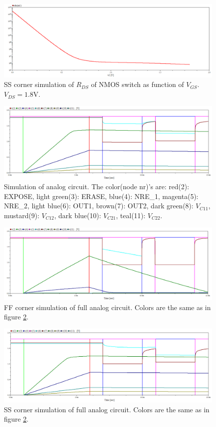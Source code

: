 \begin{figure}[H]
    \centering
    \includegraphics[width=\textwidth]{graphs/corner_ss_simulation.png}
    \caption{SS corner simulation of $R_{DS}$ of NMOS switch as function of $V_{GS}$. $V_{DS} = 1.8\mathrm{V}$.}
    \label{fig:ss}
\end{figure}

\begin{figure}[H]
    \centering
    \includegraphics[width=\textwidth]{graphs/analogWaveform.png}
    \caption{Simulation of analog circuit. The color(node nr)'s are: red(2): EXPOSE, light green(3): ERASE, blue(4): NRE\_1, magenta(5): NRE\_2, light blue(6): OUT1, brown(7): OUT2, dark green(8): $V_{C11}$, mustard(9): $V_{C12}$, dark blue(10): $V_{C21}$, teal(11): $V_{C22}$.}
    \label{fig:analogWaveform}
\end{figure}

\begin{figure}[H]
    \centering
    \includegraphics[width=\textwidth]{graphs/analogWaveform_ff.png}
    \caption{FF corner simulation of full analog circuit. Colors are the same as in figure \ref{fig:analogWaveform}.}
    \label{fig:ffFull}
\end{figure}

\begin{figure}[H]
    \centering
    \includegraphics[width=\textwidth]{graphs/analogWaveform_ss.png}
    \caption{SS corner simulation of full analog circuit. Colors are the same as in figure \ref{fig:analogWaveform}.}
    \label{fig:ssFull}
\end{figure}
